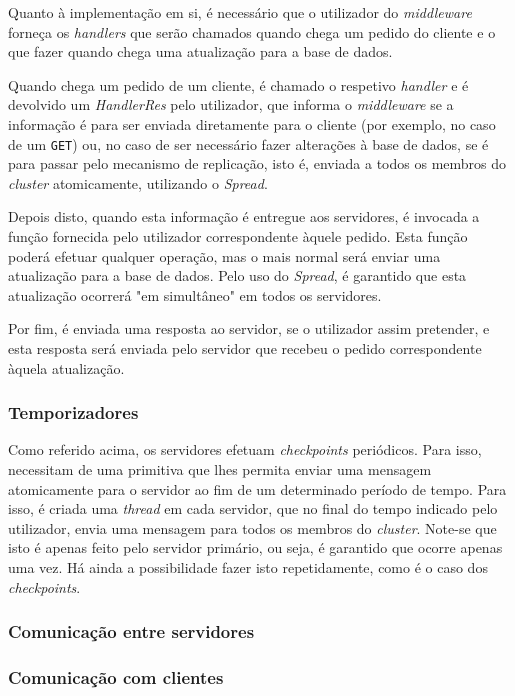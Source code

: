 \documentclass[a4paper]{report}
\begin{document}
{				Quanto à implementação em si, é necessário que o utilizador do \textit{middleware} forneça os \textit{handlers} que serão chamados quando chega um pedido do cliente e o que fazer quando chega uma atualização para a base de dados. 
				
				Quando chega um pedido de um cliente, é chamado o respetivo \textit{handler} e é devolvido um \textit{HandlerRes} pelo utilizador, que informa o \textit{middleware} se a informação é para ser enviada diretamente para o cliente (por exemplo, no caso de um \texttt{GET}) ou, no caso de ser necessário fazer alterações à base de dados, se é para passar pelo mecanismo de replicação, isto é, enviada a todos os membros do \textit{cluster} atomicamente, utilizando o \textit{Spread}.
				
				Depois disto, quando esta informação é entregue aos servidores, é invocada a função fornecida pelo utilizador correspondente àquele pedido. Esta função poderá efetuar qualquer operação, mas o mais normal será enviar uma atualização para a base de dados. Pelo uso do \textit{Spread}, é garantido que esta atualização ocorrerá "em simultâneo" em todos os servidores.
				
				Por fim, é enviada uma resposta ao servidor, se o utilizador assim pretender, e esta resposta será enviada pelo servidor que recebeu o pedido correspondente àquela atualização.

			\subsubsection{Temporizadores} \label{sssec:Timers}
				Como referido acima, os servidores efetuam \textit{checkpoints} periódicos. Para isso, necessitam de uma primitiva que lhes permita enviar uma mensagem atomicamente para o servidor ao fim de um determinado período de tempo. Para isso, é criada uma \textit{thread} em cada servidor, que no final do tempo indicado pelo utilizador, envia uma mensagem para todos os membros do \textit{cluster}. Note-se que isto é apenas feito pelo servidor primário, ou seja, é garantido que ocorre apenas uma vez. Há ainda a possibilidade fazer isto repetidamente, como é o caso dos \textit{checkpoints}.

			\subsubsection{Comunicação entre servidores} \label{sssec:ServerCommunication}
			\subsubsection{Comunicação com clientes} \label{sssec:ClientCommunication}
}
\end{document}
